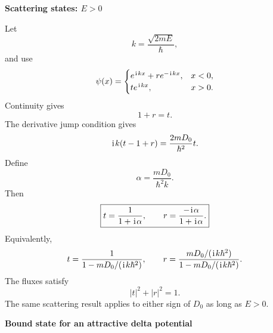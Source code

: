 \textbf{Scattering states: $E>0$}

Let
\begin{equation}
 k=\frac{\sqrt{2mE}}{\hbar},
\end{equation}
and use
\begin{equation}
 \psi(x)=
 \begin{cases}
 e^{\hspace{1pt}\mathrm{i}\hspace{1pt} kx}+r e^{-\hspace{1pt}\mathrm{i}\hspace{1pt} kx}, & x<0,\\
 t e^{\hspace{1pt}\mathrm{i}\hspace{1pt} kx}, & x>0.
 \end{cases}
\end{equation}
Continuity gives
\begin{equation}
 1+r=t.
\end{equation}
The derivative jump condition gives
\begin{equation}
 \hspace{1pt}\mathrm{i}\hspace{1pt} k(t-1+r)=\frac{2mD_0}{\hbar^2}t.
\end{equation}
Define
\begin{equation}
 \alpha=\frac{mD_0}{\hbar^2k}.
\end{equation}
Then
\begin{equation}
 \boxed{t=\frac{1}{1+\hspace{1pt}\mathrm{i}\hspace{1pt}\alpha},
 \qquad
 r=\frac{-\hspace{1pt}\mathrm{i}\hspace{1pt}\alpha}{1+\hspace{1pt}\mathrm{i}\hspace{1pt}\alpha}.}
\end{equation}
Equivalently,
\begin{equation}
 t=\frac{1}{1-mD_0/(\hspace{1pt}\mathrm{i}\hspace{1pt} k\hbar^2)},
 \qquad
 r=\frac{mD_0/(\hspace{1pt}\mathrm{i}\hspace{1pt} k\hbar^2)}{1-mD_0/(\hspace{1pt}\mathrm{i}\hspace{1pt} k\hbar^2)}.
\end{equation}
The fluxes satisfy
\begin{equation}
 |t|^2+|r|^2=1.
\end{equation}
The same scattering result applies to either sign of $D_0$ as long as
$E>0$.

\textbf{Bound state for an attractive delta potential}

